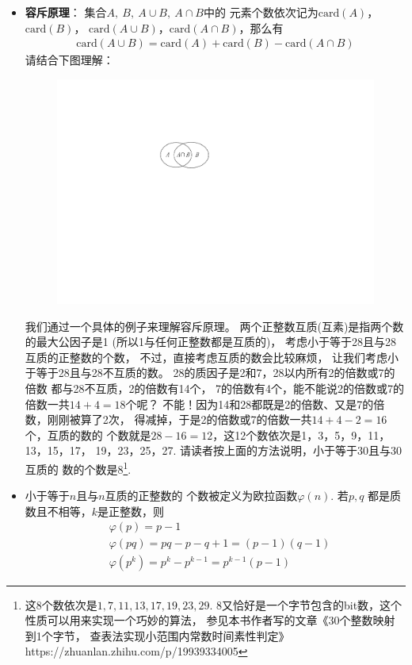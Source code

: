 \begin{itemize}[leftmargin=\inteval{\myitemleftmargin}pt,itemsep=
   \inteval{\myitemitempsep}pt,topsep=\inteval{\myitemtopsep}pt]
\item \textbf{容斥原理}： 集合$A,\ B,\ A\cup B,\ A\cap B$中的
元素个数依次记为$ \mathrm{card}(A) $，$\mathrm{card}(B) $，
$\mathrm{card}(A\cup B)$，$\mathrm{card}(A\cap B) $，那么有
\begin{gather}\label{容斥原理公式}
    \mathrm{card}(A\cup B)=\mathrm{card}(A)+\mathrm{card}(B) 
    -\mathrm{card}(A\cap B)
\end{gather}
请结合下图理解：
\begin{figure}[H]
    \centering
    \includegraphics[width=0.3\linewidth]{PDF_Picture/韦恩图-交集}
\end{figure}
我们通过一个具体的例子来理解容斥原理。
两个正整数互质(互素)是指两个数的最大公因子是1
(所以1与任何正整数都是互质的)，
考虑小于等于28且与28互质的正整数的个数，
不过，直接考虑互质的数会比较麻烦，
让我们考虑小于等于28且与28不互质的数。
28的质因子是2和7，28以内所有2的倍数或7的倍数
都与28不互质，2的倍数有14个，
7的倍数有4个，能不能说2的倍数或7的倍数一共$ 14+4=18 $个呢？
不能！因为14和28都既是2的倍数、又是7的倍数，刚刚被算了2次，
得减掉，于是2的倍数或7的倍数一共$ 14+4-2=16 $个，互质的数的
个数就是$ 28-16=12 $，这12个数依次是1，3，5，9，11，13，15，17，
19，23，25，27. 请读者按上面的方法说明，小于等于30且与30互质的
数的个数是8\footnote{这8个数依次是$ 1,7,11,13,17,19,23,29 $.\q 
    8又恰好是一个字节包含的bit数，这个性质可以用来实现一个巧妙的算法，
    参见本书作者写的文章《30个整数映射到1个字节，
    查表法实现小范围内常数时间素性判定》\\
    https://zhuanlan.zhihu.com/p/19939334005 }.

\item 小于等于$ n $且与$ n $互质的正整数的
个数被定义为欧拉函数$ \varphi(n) $. 
若$ p,q $ 都是质数且不相等，$ k $是正整数，则
\begin{align*}
    & \varphi(p)=p-1 \\
    & \varphi(pq)=pq-p-q+1=(p-1)(q-1) \\
    & \varphi(p^k)=p^k-p^{k-1}=p^{k-1}(p-1)
\end{align*}


\end{itemize}

